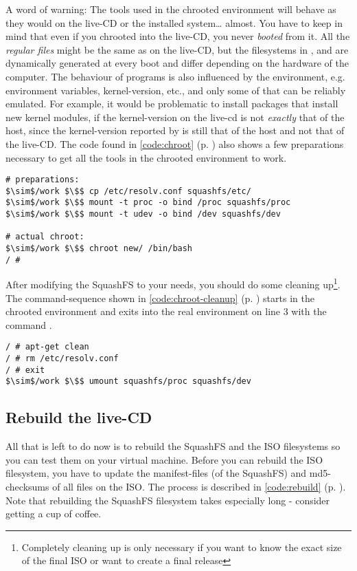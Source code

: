 A word of warning: The tools used in the chrooted environment will behave
as they would on the live-CD or the installed system\ldots{} almost. You have
to keep in mind that even if you chrooted into the live-CD, you never
\emph{booted} from it. All the \emph{regular files} might be the same as on the
live-CD, but the filesystems in ,  and  are
dynamically generated at every boot and differ depending on the hardware of the
computer. The behaviour of programs is also influenced by the environment, e.g.
environment variables, kernel-version, etc., and only some of that can be
reliably emulated. For example, it would be problematic to install packages that
install new kernel modules, if the kernel-version on the live-cd is not
\emph{exactly} that of the host, since the kernel-version reported by
 is still that of the host and not that of the live-CD.
The code found in \lstlistingname{} \ref{code:chroot} (p. 
\pageref{code:chroot}) also shows a few preparations necessary to get all the
tools in the chrooted environment to work.\\

\begin{lstlisting}[caption={Chrooting into the SquashFS filesystem},float=ht, %
label=code:chroot]
# preparations:
$\sim$/work $\$$ cp /etc/resolv.conf squashfs/etc/
$\sim$/work $\$$ mount -t proc -o bind /proc squashfs/proc
$\sim$/work $\$$ mount -t udev -o bind /dev squashfs/dev

# actual chroot:
$\sim$/work $\$$ chroot new/ /bin/bash
/ # 
\end{lstlisting}

After modifying the SquashFS to your needs, you should do some
cleaning up\footnote{Completely cleaning up is only necessary if you want to know
the exact size of the final ISO or want to create a final release}. The
command-sequence shown in \lstlistingname{} \ref{code:chroot-cleanup} (p.
\pageref{code:chroot-cleanup}) starts in the chrooted environment and exits into
the real environment on line 3 with the command .
\begin{lstlisting}[caption={Cleanup the SquashFS},float=ht,%
	label={code:chroot-cleanup}]
/ # apt-get clean
/ # rm /etc/resolv.conf
/ # exit
$\sim$/work $\$$ umount squashfs/proc squashfs/dev
\end{lstlisting}

\subsection{Rebuild the live-CD}
All that is left to do now is to rebuild the SquashFS and the ISO filesystems so
you can test them on your virtual machine. Before you can rebuild the ISO
filesystem, you have to update the manifest-files (of the SquashFS) and
md5-checksums of all files on the ISO. The process is described in \lstlistingname{}
\ref{code:rebuild} (p. \pageref{code:rebuild}). Note that rebuilding the SquashFS
filesystem takes especially long - consider getting a cup of coffee.

